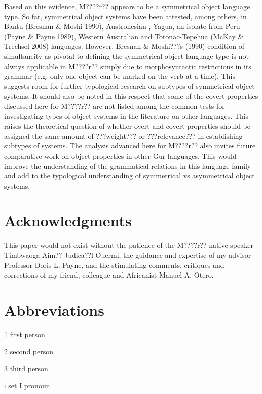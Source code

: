 \documentclass[output=paper]{langsci/langscibook}
\begin{document}
Based on this evidence, M????r?? appears to be a symmetrical object language type. So far, symmetrical object systems have been attested, among others, in Bantu (Bresnan \& Moshi 1990), Austronesian \citep{Donohue1996}, Yagua, an isolate from Peru (Payne \& Payne 1989), Western Australian \citep{Dench1995} and Totonac-Tepehua (McKay \& Trechsel 2008) languages. However, Bresnan \& Moshi???s (1990)  condition of simultaneity as pivotal to defining the symmetrical object language type is not always applicable in M????r?? simply due to morphosyntactic restrictions in its grammar (e.g. only one object can be marked on the verb at a time). This suggests room for further typological research on subtypes of symmetrical object systems. It should also be noted in this respect that some of the covert properties discussed here for M????r?? are not listed among the common tests for investigating types of object systems in the literature on other languages. This raises the theoretical question of whether overt and covert properties should be assigned the same amount of ???weight??? or ???relevance??? in establishing subtypes of systems. The analysis advanced here for M????r?? also invites future comparative work on object properties in other Gur languages. This would improve the understanding of the grammatical relations in this language family and add to the typological understanding of symmetrical vs asymmetrical object systems.

\section*{Acknowledgments}

This paper would not exist without the patience of the M????r?? native speaker Timbwaoga Aim?? Judica??l Ouermi, the guidance and expertise of my advisor Professor Doris L. Payne, and the stimulating comments, critiques and corrections of my friend, colleague and Africanist Manuel A. Otero. 

\section{Abbreviations}

1  first person



2  second person



3  third person



\textsc{i  }set I pronoun
\end{document}
